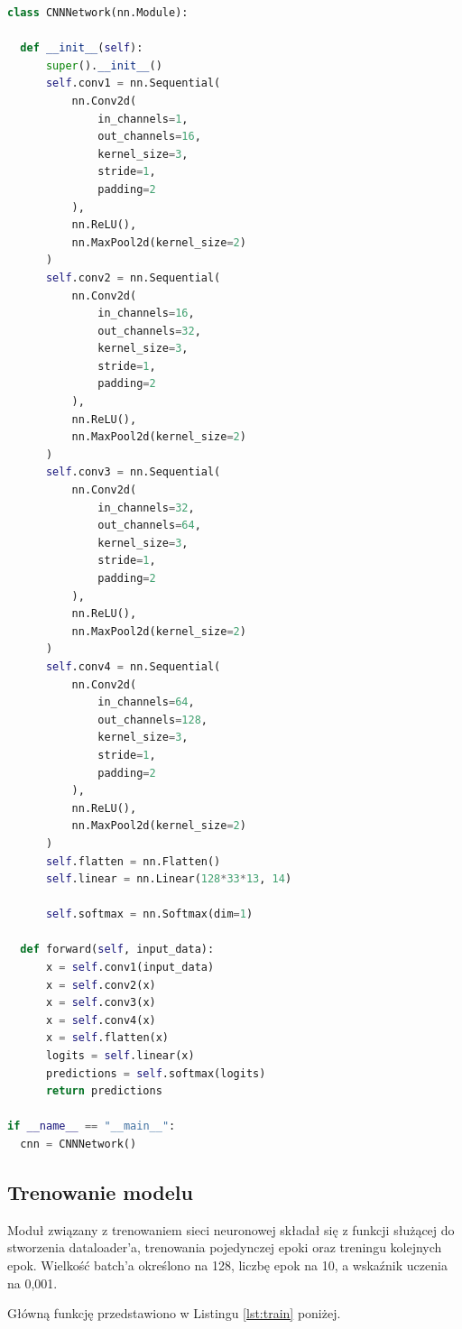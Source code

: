 \documentclass{sprz}
\begin{document}
\begin{lstlisting}[language=Python,caption={Implementacja sieci neuronowej}, label={lst:neural_network_implementation}]
  class CNNNetwork(nn.Module):

  def __init__(self):
      super().__init__()
      self.conv1 = nn.Sequential(
          nn.Conv2d(
              in_channels=1, 
              out_channels=16,  
              kernel_size=3,  
              stride=1,
              padding=2
          ),
          nn.ReLU(),
          nn.MaxPool2d(kernel_size=2)  
      )
      self.conv2 = nn.Sequential(
          nn.Conv2d(
              in_channels=16,
              out_channels=32,
              kernel_size=3,
              stride=1,
              padding=2
          ),
          nn.ReLU(),
          nn.MaxPool2d(kernel_size=2)
      )
      self.conv3 = nn.Sequential(
          nn.Conv2d(
              in_channels=32,
              out_channels=64,
              kernel_size=3,
              stride=1,
              padding=2
          ),
          nn.ReLU(),
          nn.MaxPool2d(kernel_size=2)
      )
      self.conv4 = nn.Sequential(
          nn.Conv2d(
              in_channels=64,
              out_channels=128,
              kernel_size=3,
              stride=1,
              padding=2
          ),
          nn.ReLU(),
          nn.MaxPool2d(kernel_size=2)
      )
      self.flatten = nn.Flatten()
      self.linear = nn.Linear(128*33*13, 14) 
                                             
      self.softmax = nn.Softmax(dim=1)

  def forward(self, input_data):
      x = self.conv1(input_data)
      x = self.conv2(x)
      x = self.conv3(x)
      x = self.conv4(x)
      x = self.flatten(x)
      logits = self.linear(x)
      predictions = self.softmax(logits)
      return predictions

if __name__ == "__main__":
  cnn = CNNNetwork()
\end{lstlisting}

\subsection{Trenowanie modelu}
Moduł związany z trenowaniem sieci neuronowej składał się z funkcji służącej do stworzenia dataloader'a, trenowania pojedynczej epoki oraz treningu kolejnych epok. Wielkość batch'a określono na 128, liczbę epok na 10, a wskaźnik uczenia na 0,001.

Główną funkcję przedstawiono w Listingu \ref{lst:train} poniżej.
\end{document}
